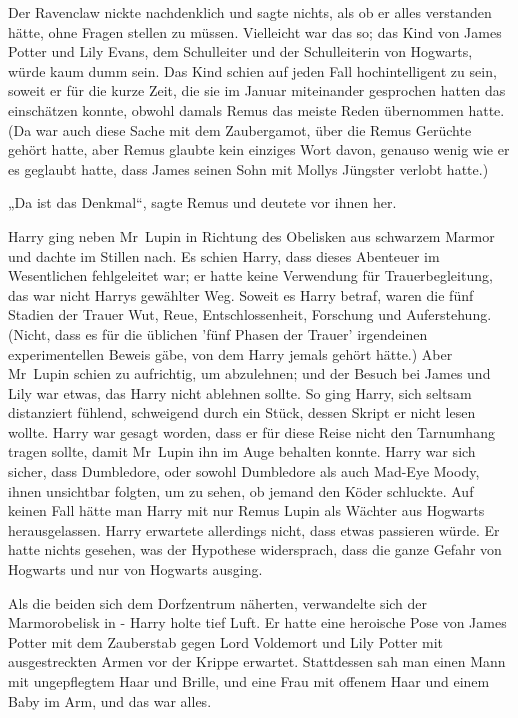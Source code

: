 {Der Ravenclaw nickte nachdenklich und sagte nichts, als ob er alles verstanden hätte, ohne Fragen stellen zu müssen. Vielleicht war das so; das Kind von James Potter und Lily Evans, dem Schulleiter und der Schulleiterin von Hogwarts, würde kaum dumm sein. Das Kind schien auf jeden Fall hochintelligent zu sein, soweit er für die kurze Zeit, die sie im Januar miteinander gesprochen hatten das einschätzen konnte, obwohl damals Remus das meiste Reden übernommen hatte. (Da war auch diese Sache mit dem Zaubergamot, über die Remus Gerüchte gehört hatte, aber Remus glaubte kein einziges Wort davon, genauso wenig wie er es geglaubt hatte, dass James seinen Sohn mit Mollys Jüngster verlobt hatte.)

„Da ist das Denkmal“, sagte Remus und deutete vor ihnen her.

Harry ging neben Mr~Lupin in Richtung des Obelisken aus schwarzem Marmor und dachte im Stillen nach. Es schien Harry, dass dieses Abenteuer im Wesentlichen fehlgeleitet war; er hatte keine Verwendung für Trauerbegleitung, das war nicht Harrys gewählter Weg. Soweit es Harry betraf, waren die fünf Stadien der Trauer Wut, Reue, Entschlossenheit, Forschung und Auferstehung. (Nicht, dass es für die üblichen 'fünf Phasen der Trauer' irgendeinen experimentellen Beweis gäbe, von dem Harry jemals gehört hätte.) Aber Mr~Lupin schien zu aufrichtig, um abzulehnen; und der Besuch bei James und Lily war etwas, das Harry nicht ablehnen sollte. So ging Harry, sich seltsam distanziert fühlend, schweigend durch ein Stück, dessen Skript er nicht lesen wollte. Harry war gesagt worden, dass er für diese Reise nicht den Tarnumhang tragen sollte, damit Mr~Lupin ihn im Auge behalten konnte. Harry war sich sicher, dass Dumbledore, oder sowohl Dumbledore als auch Mad-Eye Moody, ihnen unsichtbar folgten, um zu sehen, ob jemand den Köder schluckte. Auf keinen Fall hätte man Harry mit nur Remus Lupin als Wächter aus Hogwarts herausgelassen. Harry erwartete allerdings nicht, dass etwas passieren würde. Er hatte nichts gesehen, was der Hypothese widersprach, dass die ganze Gefahr von Hogwarts und nur von Hogwarts ausging.

Als die beiden sich dem Dorfzentrum näherten, verwandelte sich der Marmorobelisk in - Harry holte tief Luft. Er hatte eine heroische Pose von James Potter mit dem Zauberstab gegen Lord Voldemort und Lily Potter mit ausgestreckten Armen vor der Krippe erwartet. Stattdessen sah man einen Mann mit ungepflegtem Haar und Brille, und eine Frau mit offenem Haar und einem Baby im Arm, und das war alles.

}
